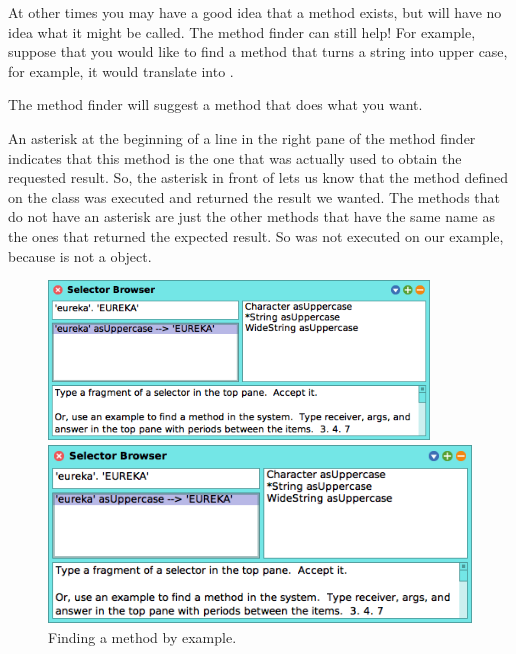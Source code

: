 \documentclass[a4paper,10pt,twoside]{book}
\begin{document}
At other times you may have a good idea that a method exists, but will have no idea what it might be called.
The method finder can still help!  For example, suppose that you would like to find a method that turns a string into upper case, for example, it would translate  into .

\noindent
The method finder will suggest a method that does what you want.

An asterisk at the beginning of a line in the right pane of the method finder indicates that this method is the one that was actually used to obtain the requested result. 
So, the asterisk in front of  lets us know that the method  defined on the class  was executed and returned the result we wanted. The methods that do not have an asterisk are just the other methods that have the same name as the ones that returned the expected result. So  was not executed on our example, because  is not a  object.

\begin{figure}[hbt]
\ifluluelse
	{\centerline {\includegraphics[width=0.9\textwidth]{MethodFinder-example1}}}
	{\centerline {\includegraphics[scale=0.7]{MethodFinder-example1}}}
\caption{Finding a method by example.
\label{fig:methodFinder-example1}}
\end{figure}
\end{document}
